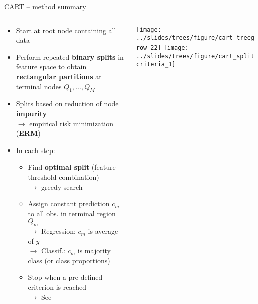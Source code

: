 \begin{frame}{CART -- method summary}

\footnotesize

 
  

\medskip

\begin{columns}[T, totalwidth=\textwidth]
\begin{column}{0.6\textwidth}
\begin{itemize}
  \item Start at root node containing all data
  \item Perform repeated \textbf{binary splits} in feature space to obtain
  \textbf{rectangular partitions} at terminal nodes $Q_1, \dots, Q_M$
  \item Splits based on reduction of node \textbf{impurity} \\
  $\rightarrow$ empirical risk minimization (\textbf{ERM})
  \item In each step:
  \begin{itemize}
    \item Find \textbf{optimal split} (feature-threshold combination) \\
    $\rightarrow$ greedy search
    \item Assign constant prediction $c_m$ to all obs. in terminal region $Q_m$\\
    $\rightarrow$ Regression: $c_m$ is average of $y$ \\
    $\rightarrow$ Classif.: $c_m$ is majority class (or class proportions)
    
  \item Stop when a pre-defined criterion is reached\\
  $\rightarrow$ See 
  \end{itemize}
\end{itemize}

\end{column}
\begin{column}{0.45\textwidth}
\texttt{[image: ../slides/trees/figure/cart\_treegrow\_22]}
\texttt{[image:    ../slides/trees/figure/cart\_splitcriteria\_1]} 
\end{column}
\end{columns}


\end{frame}

